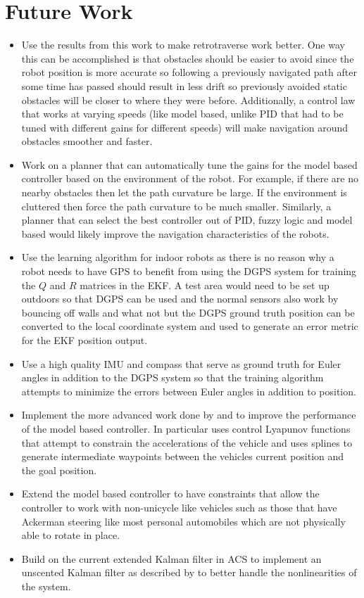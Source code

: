 \chapter{Future Work}
\label{ch:futurework}

\begin{itemize}
\item Use the results from this work to make retrotraverse work better. One way this can be accomplished is that obstacles should be easier to avoid since the robot position is more accurate so following a previously navigated path after some time has passed should result in less drift so previously avoided static obstacles will be closer to where they were before. Additionally, a control law that works at varying speeds (like model based, unlike PID that had to be tuned with different gains for different speeds) will make navigation around obstacles smoother and faster.
\item Work on a planner that can automatically tune the gains for the model based controller based on the environment of the robot. For example, if there are no nearby obstacles then let the path curvature be large. If the environment is cluttered then force the path curvature to be much smaller. Similarly, a planner that can select the best controller out of PID, fuzzy logic and model based would likely improve the navigation characteristics of the robots.
\item Use the learning algorithm for indoor robots as there is no reason why a robot needs to have GPS to benefit from using the DGPS system for training the $Q$ and $R$ matrices in the EKF. A test area would need to be set up outdoors so that DGPS can be used and the normal sensors also work by bouncing off walls and what not but the DGPS ground truth position can be converted to the local coordinate system and used to generate an error metric for the EKF position output.
\item Use a high quality IMU and compass that serve as ground truth for Euler angles in addition to the DGPS system so that the training algorithm attempts to minimize the errors between Euler angles in addition to position.
\item Implement the more advanced work done by \cite{Lapierre06} and \cite{Gulati08} to improve the performance of the model based controller. In particular \cite{Gulati08} uses control Lyapunov functions that attempt to constrain the accelerations of the vehicle and uses splines to generate intermediate waypoints between the vehicles current position and the goal position.
\item Extend the model based controller to have constraints that allow the controller to work with non-unicycle like vehicles such as those that have Ackerman steering like most personal automobiles which are not physically able to rotate in place.
\item Build on the current extended Kalman filter in ACS to implement an unscented Kalman filter as described by \cite{ThrunProbRobots06} to better handle the nonlinearities of the system.
\end{itemize}

